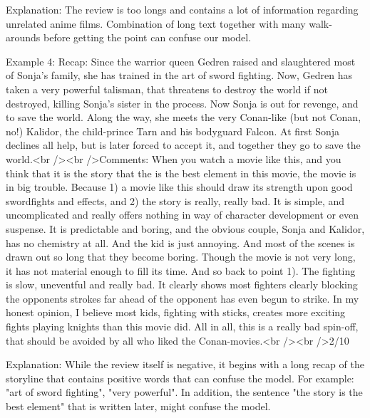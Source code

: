 \begin{simplechar}
Explanation:
The review is too longs and contains a lot of information regarding unrelated anime films. Combination of long text together with many walk-arounds before getting the point can confuse our model.

Example 4:
Recap: Since the warrior queen Gedren raised and slaughtered most of Sonja's family, she has trained in the art of sword fighting. Now, Gedren has taken a very powerful talisman, that threatens to destroy the world if not destroyed, killing Sonja's sister in the process. Now Sonja is out for revenge, and to save the world. Along the way, she meets the very Conan-like (but not Conan, no!) Kalidor, the child-prince Tarn and his bodyguard Falcon. At first Sonja declines all help, but is later forced to accept it, and together they go to save the world.<br /><br />Comments: When you watch a movie like this, and you think that it is the story that the is the best element in this movie, the movie is in big trouble. Because 1) a movie like this should draw its strength upon good swordfights and effects, and 2) the story is really, really bad. It is simple, and uncomplicated and really offers nothing in way of character development or even suspense. It is predictable and boring, and the obvious couple, Sonja and Kalidor, has no chemistry at all. And the kid is just annoying. And most of the scenes is drawn out so long that they become boring. Though the movie is not very long, it has not material enough to fill its time. And so back to point 1). The fighting is slow, uneventful and really bad. It clearly shows most fighters clearly blocking the opponents strokes far ahead of the opponent has even begun to strike. In my honest opinion, I believe most kids, fighting with sticks, creates more exciting fights playing knights than this movie did. All in all, this is a really bad spin-off, that should be avoided by all who liked the Conan-movies.<br /><br />2/10

Explanation:
While the review itself is negative, it begins with a long recap of the storyline that contains positive words that can confuse the model. For example: "art of sword fighting", "very powerful". In addition, the sentence "the story is the best element" that is written later, might confuse the model.


\end{simplechar}
